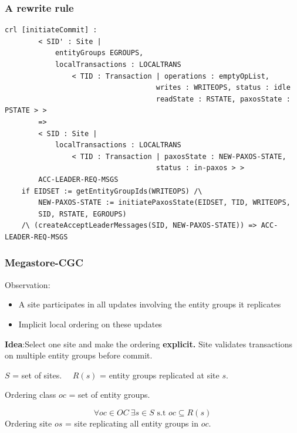 \documentclass{beamer}
\begin{document}
\begin{frame}[fragile]
    \frametitle{A rewrite rule}
    \scriptsize
    \begin{lstlisting}[language=maude]
    crl [initiateCommit] :
        < SID' : Site |
            entityGroups EGROUPS,
            localTransactions : LOCALTRANS
                < TID : Transaction | operations : emptyOpList,
                                    writes : WRITEOPS, status : idle
                                    readState : RSTATE, paxosState : PSTATE > >
        =>
        < SID : Site |
            localTransactions : LOCALTRANS
                < TID : Transaction | paxosState : NEW-PAXOS-STATE,
                                    status : in-paxos > >
        ACC-LEADER-REQ-MSGS
    if EIDSET := getEntityGroupIds(WRITEOPS) /\
        NEW-PAXOS-STATE := initiatePaxosState(EIDSET, TID, WRITEOPS,
        SID, RSTATE, EGROUPS)
    /\ (createAcceptLeaderMessages(SID, NEW-PAXOS-STATE)) => ACC-LEADER-REQ-MSGS
        \end{lstlisting}
\end{frame}
\begin{frame}
\frametitle{Megastore-CGC}
    \small 
    Observation:
    \begin{itemize}
        \item A site participates in all updates involving the entity groups it replicates 
        \item Implicit local ordering on these updates
    \end{itemize}  
            
    \textbf{Idea}:Select one site and make the ordering \textbf{explicit.}
    Site validates transactions on multiple entity groups before commit.

    \bigskip

    

    $S$ = set of sites. $\quad R(s)$ = entity groups replicated at site $s$.

    \medskip
    Ordering class $oc$ = set of entity groups.
    
    $$ \forall oc \in OC\ \exists s \in S\text{ s.t } oc \subseteq R(s)$$
    \medskip
    Ordering site $os$ = site replicating all entity groups in $oc$.
\end{frame}
\end{document}
